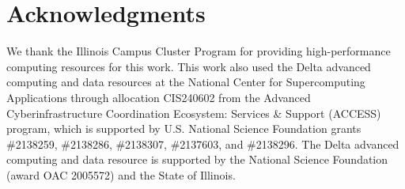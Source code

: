 \section{Acknowledgments}
We thank the Illinois Campus Cluster Program for providing high-performance computing resources for this work. This work also used the Delta advanced computing and data resources at the National Center for Supercomputing Applications through allocation CIS240602 from the Advanced Cyberinfrastructure Coordination Ecosystem: Services \& Support (ACCESS) program, which is supported by U.S. National Science Foundation grants \#2138259, \#2138286, \#2138307, \#2137603, and \#2138296. The Delta advanced computing and data resource is supported by the National Science Foundation (award OAC 2005572) and the State of Illinois.
\nocite{access}